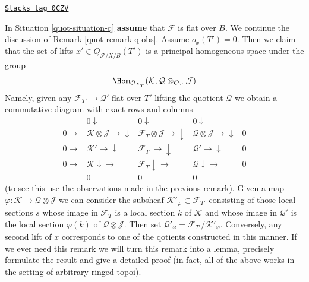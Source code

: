 \begin{remark}

\label{quot-remark-q-defos}
\href{https://stacks.math.columbia.edu/tag/0CZV}{\texttt{Stacks tag 0CZV}}

In Situation \ref{quot-situation-q} {\bf assume} that $\mathcal{F}$ is flat
over $B$. We continue the discussion of Remark \ref{quot-remark-q-obs}.
Assume $o_x(T') = 0$. Then we claim that the set of lifts
$x' \in Q_{\mathcal{F}/X/B}(T')$ is a principal homogeneous space
under the group
$$
\Hom_{\mathcal{O}_{X_T}}(\mathcal{K},
\mathcal{Q} \otimes_{\mathcal{O}_T} \mathcal{J})
$$
Namely, given any $\mathcal{F}_{T'} \to \mathcal{Q}'$ flat over $T'$
lifting the quotient $\mathcal{Q}$ we obtain a commutative diagram
with exact rows and columns
$$
\begin{array}{ccccc} & 0 \downarrow & 0 \downarrow & 0 \downarrow &  \\ 0 \longrightarrow & \mathcal{K} \otimes \mathcal{J} \longrightarrow\downarrow & \mathcal{F}_T \otimes \mathcal{J} \longrightarrow\downarrow & \mathcal{Q} \otimes \mathcal{J} \longrightarrow\downarrow & 0 \\ 0 \longrightarrow & \mathcal{K}' \longrightarrow\downarrow & \mathcal{F}_{T'} \longrightarrow\downarrow & \mathcal{Q}' \longrightarrow\downarrow & 0 \\ 0 \longrightarrow & \mathcal{K} \downarrow\longrightarrow & \mathcal{F}_T \downarrow\longrightarrow & \mathcal{Q} \downarrow\longrightarrow & 0 \\  & 0 & 0 & 0 & \end{array}
$$
(to see this use the observations made in the previous remark).
Given a map $\varphi : \mathcal{K} \to \mathcal{Q} \otimes \mathcal{J}$
we can consider the subsheaf $\mathcal{K}'_\varphi \subset \mathcal{F}_{T'}$
consisting of those local sections $s$
whose image in $\mathcal{F}_T$ is a local section $k$ of $\mathcal{K}$
and whose image in $\mathcal{Q}'$ is the local section $\varphi(k)$ of
$\mathcal{Q} \otimes \mathcal{J}$. Then set
$\mathcal{Q}'_\varphi = \mathcal{F}_{T'}/\mathcal{K}'_\varphi$.
Conversely, any second lift of $x$ corresponds to one of the
qotients constructed in this manner. If we ever need this
remark we will turn this remark into a lemma, precisely formulate
the result and give a detailed proof (in fact, all of the above
works in the setting of arbitrary ringed topoi).
\end{remark}

